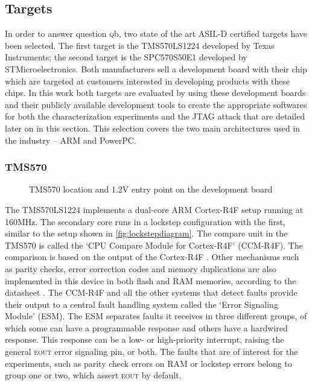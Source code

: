 \documentclass[10pt]{article}
\newcommand{\TI}{TMS570\xspace}
\newcommand{\Qb}{\textsc{q}b\xspace}
\newcommand{\errorpin}{\textsc{eout}\xspace}
\begin{document}
  \subsection{Targets } 
  \label{sec:targets}

    In order to answer question \Qb , two state of the art ASIL-D certified targets have been selected. The first target is the TMS570LS1224 \cite{texas_instruments_tms570ls1224} developed by Texas Instruments; the second target is the SPC570S50E1 \cite{stmicroelectronics_spc570s50e1} developed by STMicroelectronics. Both manufacturers sell a development board with their chip \cite{texas_instruments_launchxl2-tms57012,stmicroelectronics_spc57s-discovery} which are targeted at customers interested in developing products with these chips. In this work both targets are evaluated by using these development boards and their publicly available development tools to create the appropriate softwares for both the characterization experiments and the JTAG attack that are detailed later on in this section. 
    This selection covers 
    the two main architectures used in the industry -- ARM and PowerPC.

    \subsubsection{\TI }
    \label{sec:target-ti}
      \begin{figure}[H]
        \centering
        \def\svgwidth{\columnwidth}
        
        \caption{TMS570 location and 1.2V entry point on the development board}
        \label{fig:ti-pic}
      \end{figure}
      
      The TMS570LS1224 implements a dual-core ARM Cortex-R4F setup running at 160MHz. The secondary core runs in a lockstep configuration with the first, similar to the setup shown in \autoref{fig:lockstepdiagram}. 
      The compare unit in the \TI is called the `CPU Compare Module for Cortex-R4F' (CCM-R4F). The comparison is based on the output of the Cortex-R4F \cite{arm_cortex-r4_2011}.
      Other mechanisms such as parity checks, error correction codes and memory duplications are also implemented in this device in both flash and RAM memories, according to the datasheet \cite{texas_instruments_datasheet_2015}. 
      The CCM-R4F and all the other systems that detect faults provide their output to a central fault handling system called the `Error Signaling Module' (ESM). The ESM separates faults it receives in three different groups, of which some can have a programmable response and others have a hardwired response. This response can be a low- or high-priority interrupt, raising the general \errorpin error signaling pin, or both. The faults that are of interest for the experiments, such as parity check errors on RAM or lockstep errors belong to group one or two, which assert \errorpin by default. 
\end{document}
